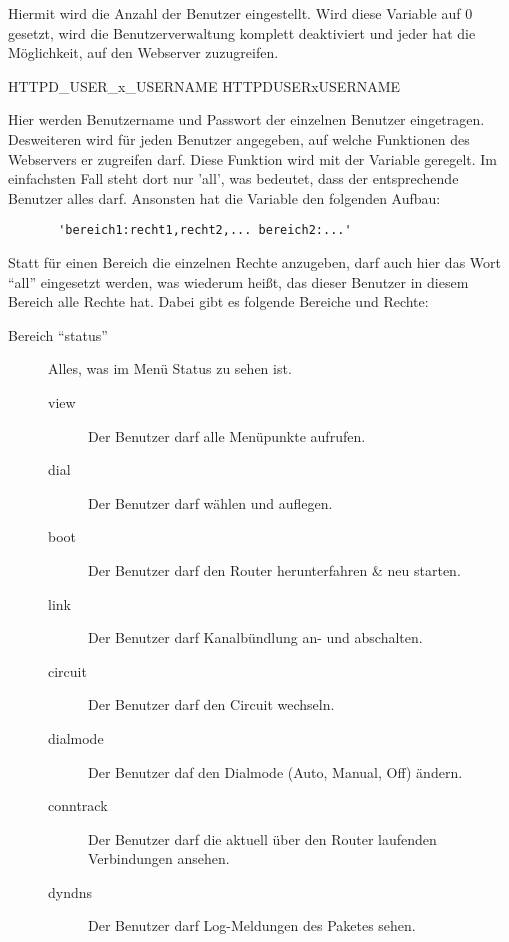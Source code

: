 \begin{description}
    {Hiermit wird die Anzahl der Benutzer eingestellt. Wird diese Variable
    auf 0 gesetzt, wird die Benutzerverwaltung komplett deaktiviert und
    jeder hat die Möglichkeit, auf den Webserver zuzugreifen.}

       {HTTPD\_USER\_x\_USERNAME}
       {HTTPDUSERxUSERNAME}
   
    {Hier werden Benutzername und Passwort der einzelnen Benutzer
    eingetragen. Desweiteren wird für jeden Benutzer angegeben, auf
    welche Funktionen des Webservers er zugreifen darf. Diese Funktion
    wird mit der Variable  geregelt. Im einfachsten Fall
    steht dort nur 'all', was bedeutet, dass der entsprechende Benutzer
    alles darf. Ansonsten hat die Variable den folgenden Aufbau:

\begin{example}
\begin{verbatim}
       'bereich1:recht1,recht2,... bereich2:...'
\end{verbatim}
\end{example}

    Statt für einen Bereich die einzelnen Rechte anzugeben, darf auch
    hier das Wort ``all'' eingesetzt werden, was wiederum heißt, das
    dieser Benutzer in diesem Bereich alle Rechte hat. Dabei gibt es
    folgende Bereiche und Rechte:

      \begin{description}
      \item[Bereich ``status''] Alles, was im Menü Status zu sehen ist.
        \begin{description}
        \item[view] Der Benutzer darf alle Menüpunkte aufrufen.
        \item[dial] Der Benutzer darf wählen und auflegen.
        \item[boot] Der Benutzer darf den Router herunterfahren \&
                    neu starten.
        \item[link] Der Benutzer darf Kanalbündlung an- und abschalten.
        \item[circuit] Der Benutzer darf den Circuit wechseln.
        \item[dialmode] Der Benutzer daf den Dialmode (Auto, Manual,
                        Off) ändern.
        \item[conntrack] Der Benutzer darf die aktuell über den Router laufenden
	                  Verbindungen ansehen.
        \item[dyndns] Der Benutzer darf Log-Meldungen des  Paketes sehen.
       \end{description}


\end{description}}
\end{description}
